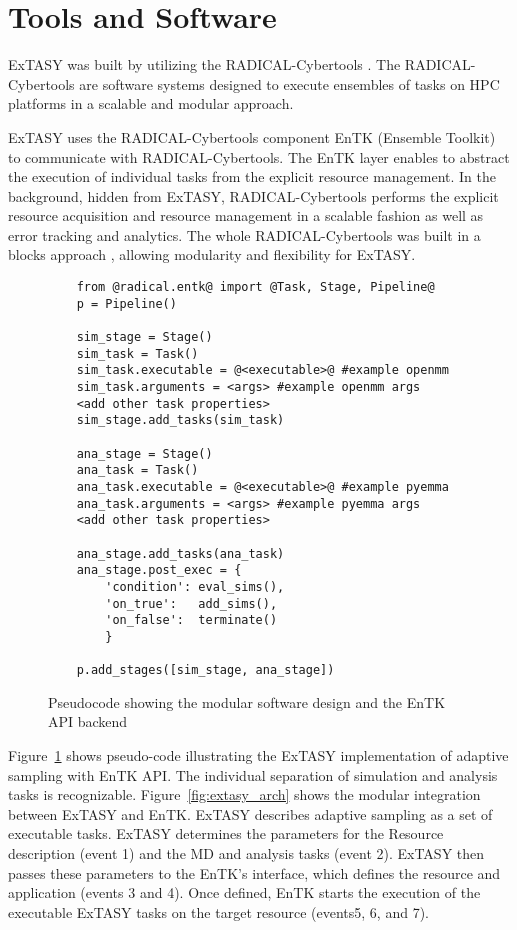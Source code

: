 {\section{\label{sec:Tools}Tools and Software}

ExTASY was built by utilizing the RADICAL-Cybertools \cite{Balasubramanian2019rct}. The RADICAL-Cybertools are software systems designed to execute ensembles of tasks on HPC platforms in a scalable and modular approach.

ExTASY uses the RADICAL-Cybertools component EnTK (Ensemble Toolkit)
\cite{entk-icpp-2016, balasubramanian2018harnessing} to communicate with RADICAL-Cybertools. The EnTK layer enables to abstract the execution of individual tasks from the explicit resource
management. In the background, hidden from ExTASY, RADICAL-Cybertools performs the explicit resource acquisition and resource management in a scalable fashion as well as error tracking and analytics. The whole RADICAL-Cybertools was built in a blocks approach \cite{turilli2018building}, allowing modularity and flexibility for ExTASY.


\begin{figure}[h!]
    \begin{lstlisting}
    from @radical.entk@ import @Task, Stage, Pipeline@
    p = Pipeline()

    sim_stage = Stage()   
    sim_task = Task()
    sim_task.executable = @<executable>@ #example openmm
    sim_task.arguments = <args> #example openmm args
    <add other task properties>
    sim_stage.add_tasks(sim_task)
    
    ana_stage = Stage()
    ana_task = Task()
    ana_task.executable = @<executable>@ #example pyemma
    ana_task.arguments = <args> #example pyemma args
    <add other task properties>
    
    ana_stage.add_tasks(ana_task)
    ana_stage.post_exec = {
        'condition': eval_sims(),
        'on_true':   add_sims(),
        'on_false':  terminate()
        }
    
    p.add_stages([sim_stage, ana_stage])
    \end{lstlisting}
    \caption{Pseudocode showing the modular software design and the EnTK API backend}\label{extasy_snippet}
\end{figure}


Figure~\ref{extasy_snippet} shows pseudo-code illustrating the ExTASY implementation of adaptive sampling with EnTK API. The individual separation of simulation and analysis tasks is recognizable. Figure~\ref{fig:extasy_arch} shows the modular integration between ExTASY and EnTK. ExTASY describes adaptive sampling as a set of executable tasks. ExTASY determines the parameters for the Resource description (event 1) and the MD and analysis tasks (event 2). ExTASY then passes these parameters to the EnTK's interface, which defines the resource and application (events 3 and 4). Once defined, EnTK starts the execution of the executable ExTASY tasks on the target resource (events5, 6, and 7). 

}
